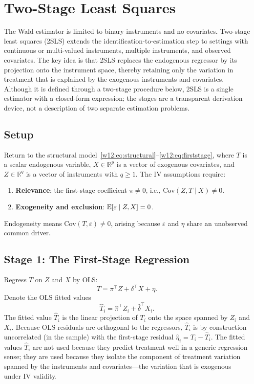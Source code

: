 \documentclass[master.tex]{subfiles}
\begin{document}
\section{Two-Stage Least Squares}
\label{w12:sec:2sls}

The Wald estimator is limited to binary instruments and no covariates.
Two-stage least squares (2SLS) extends the identification-to-estimation
step to settings with continuous or multi-valued instruments, multiple
instruments, and observed covariates.  The key idea is that 2SLS
replaces the endogenous regressor by its projection onto the instrument
space, thereby retaining only the variation in treatment that is
explained by the exogenous instruments and covariates.  Although it
is defined through a two-stage procedure below, 2SLS is a single
estimator with a closed-form expression; the stages are a transparent
derivation device, not a description of two separate estimation
problems.

\subsection{Setup}

Return to the structural model~\eqref{w12:eq:structural}--\eqref{w12:eq:firststage},
where $T$ is a scalar endogenous variable, $X \in \mathbb{R}^p$ is a
vector of exogenous covariates, and $Z \in \mathbb{R}^q$ is a vector of
instruments with $q \geq 1$.  The IV assumptions require:
\begin{enumerate}
  \item \textbf{Relevance}: the first-stage coefficient $\pi \neq 0$,
    i.e., $\mathrm{Cov}(Z, T \mid X) \neq 0$.
  \item \textbf{Exogeneity and exclusion}: $\mathbb{E}[\varepsilon \mid Z, X] = 0$.
\end{enumerate}
Endogeneity means $\mathrm{Cov}(T, \varepsilon) \neq 0$, arising
because $\varepsilon$ and $\eta$ share an unobserved common driver.

\subsection{Stage 1: The First-Stage Regression}

Regress $T$ on $Z$ and $X$ by OLS:
\[
  T = \pi^\top Z + \delta^\top X + \eta.
\]
Denote the OLS fitted values
\[
  \hat{T}_i = \hat\pi^\top Z_i + \hat\delta^\top X_i.
\]
The fitted value $\hat{T}_i$ is the linear projection of $T_i$ onto
the space spanned by $Z_i$ and $X_i$.  Because OLS residuals are
orthogonal to the regressors, $\hat{T}_i$ is by construction
uncorrelated (in the sample) with the first-stage residual
$\hat\eta_i = T_i - \hat{T}_i$.  The fitted values $\hat{T}_i$ are
not used because they predict treatment well in a generic regression
sense; they are used because they isolate the component of treatment
variation spanned by the instruments and covariates---the variation
that is exogenous under IV validity.
\end{document}
